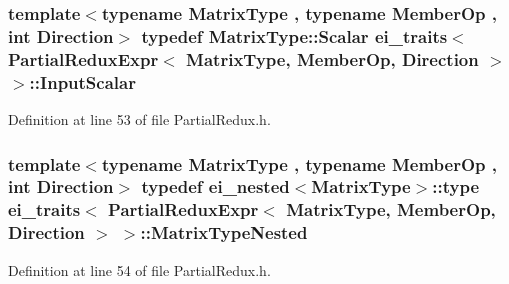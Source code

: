 \hypertarget{structei__traits_3_01_partial_redux_expr_3_01_matrix_type_00_01_member_op_00_01_direction_01_4_01_4_a8397852e5119754c311a9260900296b9}{
\subsubsection[{Input\-Scalar}]{\setlength{\rightskip}{0pt plus 5cm}template$<$typename Matrix\-Type , typename Member\-Op , int Direction$>$ typedef Matrix\-Type\-::\-Scalar {\bf ei\-\_\-traits}$<$ {\bf Partial\-Redux\-Expr}$<$ Matrix\-Type, Member\-Op, Direction $>$ $>$\-::{\bf Input\-Scalar}}}\label{structei__traits_3_01_partial_redux_expr_3_01_matrix_type_00_01_member_op_00_01_direction_01_4_01_4_a8397852e5119754c311a9260900296b9}


Definition at line 53 of file Partial\-Redux.\-h.

\hypertarget{structei__traits_3_01_partial_redux_expr_3_01_matrix_type_00_01_member_op_00_01_direction_01_4_01_4_ab9457c4a06b40274691c6ce7cf6b5987}{
\subsubsection[{Matrix\-Type\-Nested}]{\setlength{\rightskip}{0pt plus 5cm}template$<$typename Matrix\-Type , typename Member\-Op , int Direction$>$ typedef {\bf ei\-\_\-nested}$<$Matrix\-Type$>$\-::{\bf type} {\bf ei\-\_\-traits}$<$ {\bf Partial\-Redux\-Expr}$<$ Matrix\-Type, Member\-Op, Direction $>$ $>$\-::{\bf Matrix\-Type\-Nested}}}\label{structei__traits_3_01_partial_redux_expr_3_01_matrix_type_00_01_member_op_00_01_direction_01_4_01_4_ab9457c4a06b40274691c6ce7cf6b5987}


Definition at line 54 of file Partial\-Redux.\-h.

